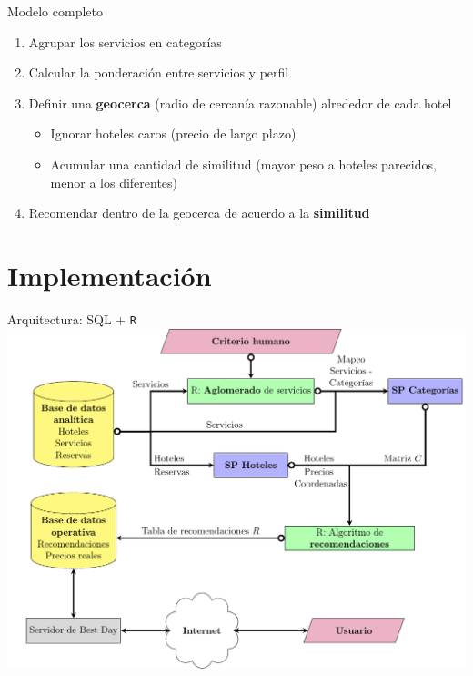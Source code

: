 \documentclass{beamer}
\begin{document}
\begin{frame}{Modelo completo}
	\begin{enumerate}%
		\item Agrupar los servicios en categorías
		\item Calcular la ponderación entre servicios y perfil
		\item Definir una \textbf{geocerca} (radio de cercanía razonable) alrededor de cada hotel
		\begin{itemize}
			\item Ignorar hoteles caros (precio de largo plazo)
			\item Acumular una cantidad de similitud (mayor peso a hoteles parecidos, menor a los diferentes)
		\end{itemize}
		\item Recomendar dentro de la geocerca de acuerdo a la \textbf{similitud}
	\end{enumerate}
\end{frame}

\section{Implementación}

\begin{frame}{Arquitectura: SQL + \texttt{R}}
	\includegraphics[width=\textwidth]{imagenes/flowchart.pdf}
\end{frame}
\end{document}
